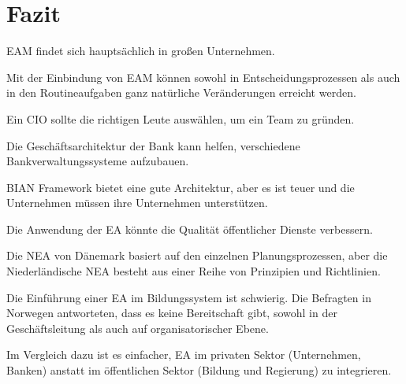 \documentclass[
	doc,
	a4paper,
	helv
	]{apa6}
\begin{document}
\section{Fazit}
\begin{APAitemize}
\item EAM findet sich hauptsächlich in großen Unternehmen.
\item Mit der Einbindung von EAM können sowohl in Entscheidungsprozessen als auch in den Routineaufgaben ganz natürliche Veränderungen erreicht werden.
\item Ein CIO sollte die richtigen Leute auswählen, um ein Team zu gründen.
\item Die Geschäftsarchitektur der Bank kann helfen, verschiedene Bankverwaltungssysteme aufzubauen.
\item BIAN Framework bietet eine gute Architektur, aber es ist teuer und die Unternehmen müssen ihre Unternehmen unterstützen.
\item Die Anwendung der EA könnte die Qualität öffentlicher Dienste verbessern. \item Die NEA von Dänemark basiert auf den einzelnen Planungsprozessen, aber die Niederländische NEA besteht aus einer Reihe von Prinzipien und Richtlinien.
\item Die Einführung einer EA im Bildungssystem ist schwierig. Die Befragten in Norwegen antworteten, dass es keine Bereitschaft gibt, sowohl in der Geschäftsleitung als auch auf organisatorischer Ebene.
\item Im Vergleich dazu ist es einfacher, EA im privaten Sektor (Unternehmen, Banken) anstatt im öffentlichen Sektor (Bildung und Regierung) zu integrieren.
\end{APAitemize}

\newpage

\printbibliography
\end{document}
